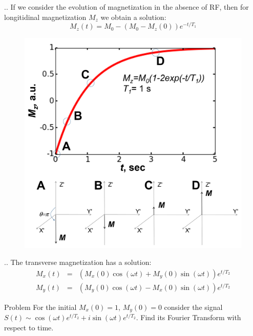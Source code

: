 \documentclass{beamer}
\begin{document}
\begin{frame}{\thesection.\thesubsection. \insertsubsection}
	If we consider the evolution of magnetization in the absence of RF, then for longitidinal magnetization $M_z$ we obtain a solution:
	\begin{equation}
		M_z(t) = M_0 - (M_0 - M_z(0)  ) e^{-t/T_1}		
	\end{equation}

\begin{figure}
	\centering
	\includegraphics[scale=0.2]{figures/T1buildup.png}
\end{figure}


\end{frame}



\begin{frame}{\thesection.\thesubsection. \insertsubsection}
	The transverse magnetization has a solution:
	\begin{equation} \label{eq: transverse magnetization}
	\begin{array}{lcl}
       M_x(t)&=& (M_x(0) \cos( \omega t)  + M_y(0) \sin( \omega t)) e^{t/T_2} \\     
       M_y(t)&=& (M_y(0) \cos( \omega t)  - M_x(0) \sin( \omega t)) e^{t/T_2} 
	\end{array}
	\end{equation}


\begin{block}{Problem}
	For the initial $M_x(0)=1$, $M_y(0)=0$ consider the signal $S(t) \sim  \cos( \omega t) e^{t/T_2}  + i \sin( \omega t) e^{t/T_2}  $. Find its Fourier Transform with respect to time.	
\end{block}

\end{frame}
\end{document}
